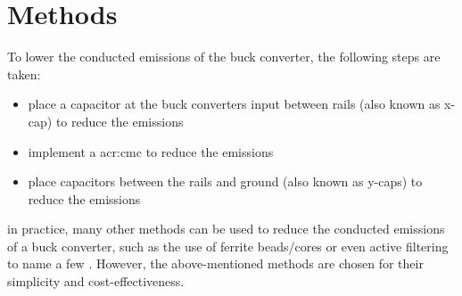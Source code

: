 \chapter{Methods}
\label{chapter:methods}

To lower the conducted emissions of the buck converter, the following steps are taken:
\begin{itemize}
    \item place a capacitor at the buck converters input between rails (also known as x-cap) to reduce the  emissions \autocite{HowGetBest}
    \item implement a \gls{acr:cmc} to reduce the  emissions \autocite{HowGetBest}
    \item place capacitors between the rails and ground (also known as y-caps) to reduce the  emissions \autocite{hegartyHowActiveEMI2023}
\end{itemize}



in practice, many other methods can be used to reduce the conducted emissions of a buck converter, such as the use of ferrite beads/cores or even active filtering to name a few \autocite{hegartyHowActiveEMI2023,damnjanovicComparisonDifferentStructures2006}. However, the above-mentioned methods are chosen for their simplicity and cost-effectiveness.


